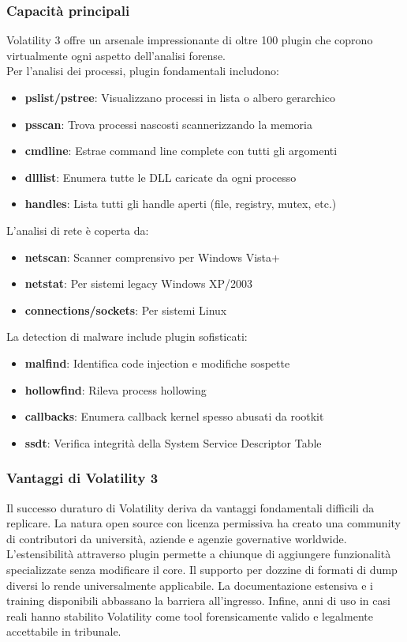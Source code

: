 \subsubsection{Capacità principali}
Volatility 3 offre un arsenale impressionante di oltre 100 plugin che coprono virtualmente ogni aspetto dell'analisi forense.\\
Per l'analisi dei processi, plugin fondamentali includono:
\begin{itemize}
    \item \textbf{pslist/pstree}: Visualizzano processi in lista o albero gerarchico
    \item \textbf{psscan}: Trova processi nascosti scannerizzando la memoria
    \item \textbf{cmdline}: Estrae command line complete con tutti gli argomenti
    \item \textbf{dlllist}: Enumera tutte le DLL caricate da ogni processo
    \item \textbf{handles}: Lista tutti gli handle aperti (file, registry, mutex, etc.)
\end{itemize}
L'analisi di rete è coperta da:
\begin{itemize}
    \item \textbf{netscan}: Scanner comprensivo per Windows Vista+
    \item \textbf{netstat}: Per sistemi legacy Windows XP/2003
    \item \textbf{connections/sockets}: Per sistemi Linux
\end{itemize}
La detection di malware include plugin sofisticati:
\begin{itemize}
    \item \textbf{malfind}: Identifica code injection e modifiche sospette
    \item \textbf{hollowfind}: Rileva process hollowing
    \item \textbf{callbacks}: Enumera callback kernel spesso abusati da rootkit
    \item \textbf{ssdt}: Verifica integrità della System Service Descriptor Table
\end{itemize}

\subsubsection{Vantaggi di Volatility 3}
Il successo duraturo di Volatility deriva da vantaggi fondamentali difficili da replicare. La natura open source con licenza permissiva ha creato una community di contributori da università, aziende e agenzie governative worldwide. L'estensibilità attraverso plugin permette a chiunque di aggiungere funzionalità specializzate senza modificare il core. Il supporto per dozzine di formati di dump diversi lo rende universalmente applicabile. La documentazione estensiva e i training disponibili abbassano la barriera all'ingresso. Infine, anni di uso in casi reali hanno stabilito Volatility come tool forensicamente valido e legalmente accettabile in tribunale.

